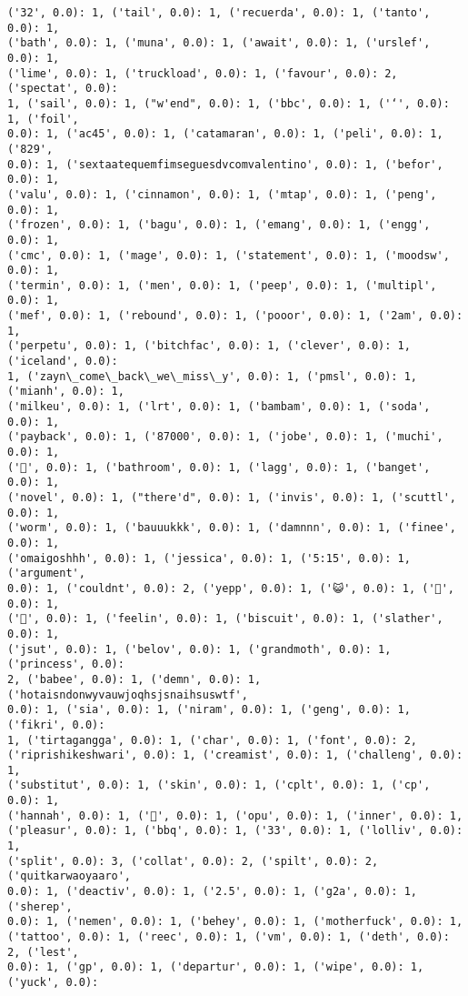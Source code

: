 \documentclass[11pt]{article}
\begin{document}
\begin{Verbatim}[commandchars=\\\{\}]
('32', 0.0): 1, ('tail', 0.0): 1, ('recuerda', 0.0): 1, ('tanto', 0.0): 1,
('bath', 0.0): 1, ('muna', 0.0): 1, ('await', 0.0): 1, ('urslef', 0.0): 1,
('lime', 0.0): 1, ('truckload', 0.0): 1, ('favour', 0.0): 2, ('spectat', 0.0):
1, ('sail', 0.0): 1, ("w'end", 0.0): 1, ('bbc', 0.0): 1, ('‘', 0.0): 1, ('foil',
0.0): 1, ('ac45', 0.0): 1, ('catamaran', 0.0): 1, ('peli', 0.0): 1, ('829',
0.0): 1, ('sextaatequemfimseguesdvcomvalentino', 0.0): 1, ('befor', 0.0): 1,
('valu', 0.0): 1, ('cinnamon', 0.0): 1, ('mtap', 0.0): 1, ('peng', 0.0): 1,
('frozen', 0.0): 1, ('bagu', 0.0): 1, ('emang', 0.0): 1, ('engg', 0.0): 1,
('cmc', 0.0): 1, ('mage', 0.0): 1, ('statement', 0.0): 1, ('moodsw', 0.0): 1,
('termin', 0.0): 1, ('men', 0.0): 1, ('peep', 0.0): 1, ('multipl', 0.0): 1,
('mef', 0.0): 1, ('rebound', 0.0): 1, ('pooor', 0.0): 1, ('2am', 0.0): 1,
('perpetu', 0.0): 1, ('bitchfac', 0.0): 1, ('clever', 0.0): 1, ('iceland', 0.0):
1, ('zayn\_come\_back\_we\_miss\_y', 0.0): 1, ('pmsl', 0.0): 1, ('mianh', 0.0): 1,
('milkeu', 0.0): 1, ('lrt', 0.0): 1, ('bambam', 0.0): 1, ('soda', 0.0): 1,
('payback', 0.0): 1, ('87000', 0.0): 1, ('jobe', 0.0): 1, ('muchi', 0.0): 1,
('🎈', 0.0): 1, ('bathroom', 0.0): 1, ('lagg', 0.0): 1, ('banget', 0.0): 1,
('novel', 0.0): 1, ("there'd", 0.0): 1, ('invis', 0.0): 1, ('scuttl', 0.0): 1,
('worm', 0.0): 1, ('bauuukkk', 0.0): 1, ('damnnn', 0.0): 1, ('finee', 0.0): 1,
('omaigoshhh', 0.0): 1, ('jessica', 0.0): 1, ('5:15', 0.0): 1, ('argument',
0.0): 1, ('couldnt', 0.0): 2, ('yepp', 0.0): 1, ('😺', 0.0): 1, ('💒', 0.0): 1,
('💎', 0.0): 1, ('feelin', 0.0): 1, ('biscuit', 0.0): 1, ('slather', 0.0): 1,
('jsut', 0.0): 1, ('belov', 0.0): 1, ('grandmoth', 0.0): 1, ('princess', 0.0):
2, ('babee', 0.0): 1, ('demn', 0.0): 1, ('hotaisndonwyvauwjoqhsjsnaihsuswtf',
0.0): 1, ('sia', 0.0): 1, ('niram', 0.0): 1, ('geng', 0.0): 1, ('fikri', 0.0):
1, ('tirtagangga', 0.0): 1, ('char', 0.0): 1, ('font', 0.0): 2,
('riprishikeshwari', 0.0): 1, ('creamist', 0.0): 1, ('challeng', 0.0): 1,
('substitut', 0.0): 1, ('skin', 0.0): 1, ('cplt', 0.0): 1, ('cp', 0.0): 1,
('hannah', 0.0): 1, ('💙', 0.0): 1, ('opu', 0.0): 1, ('inner', 0.0): 1,
('pleasur', 0.0): 1, ('bbq', 0.0): 1, ('33', 0.0): 1, ('lolliv', 0.0): 1,
('split', 0.0): 3, ('collat', 0.0): 2, ('spilt', 0.0): 2, ('quitkarwaoyaaro',
0.0): 1, ('deacti̇v', 0.0): 1, ('2.5', 0.0): 1, ('g2a', 0.0): 1, ('sherep',
0.0): 1, ('nemen', 0.0): 1, ('behey', 0.0): 1, ('motherfuck', 0.0): 1,
('tattoo', 0.0): 1, ('reec', 0.0): 1, ('vm', 0.0): 1, ('deth', 0.0): 2, ('lest',
0.0): 1, ('gp', 0.0): 1, ('departur', 0.0): 1, ('wipe', 0.0): 1, ('yuck', 0.0):

\end{Verbatim}
\end{document}
